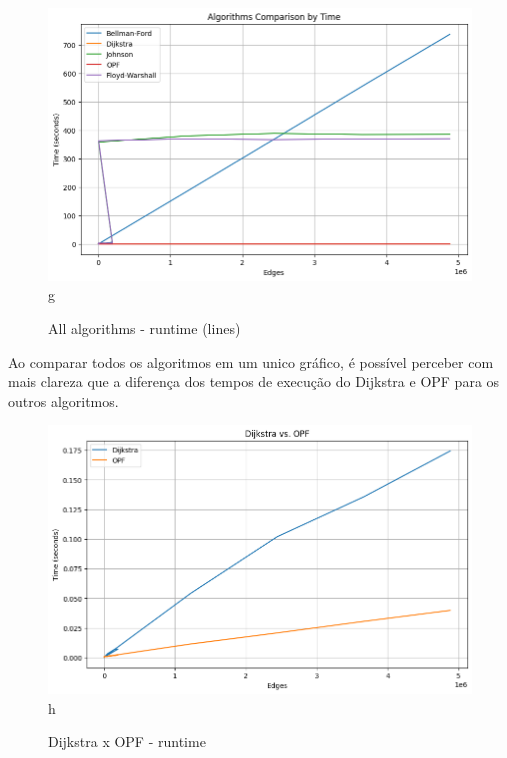 \documentclass[12pt]{article}
\begin{document}
\begin{figure}[H]
    \centering
        \includegraphics[scale=0.5]{allByTime_lines.png}{g}
        \caption{All algorithms - runtime (lines)}
\end{figure}

Ao comparar todos os algoritmos em um unico gráfico, é possível perceber com mais clareza que a diferença dos tempos de execução do Dijkstra e OPF para os outros algoritmos.

\begin{figure}[H]
    \centering
        \includegraphics[scale=0.5]{opfxdijkstra.png}{h}
        \caption{Dijkstra x OPF - runtime}
\end{figure}
\end{document}
